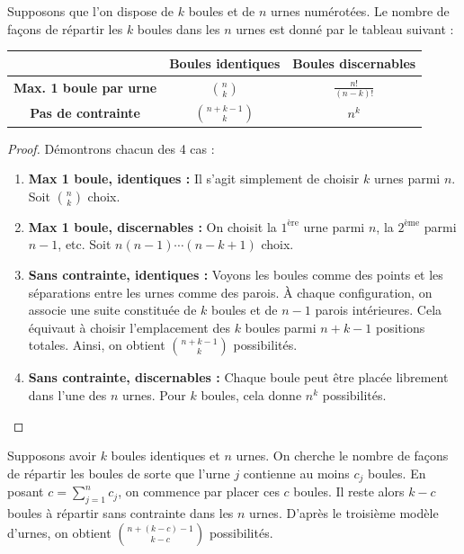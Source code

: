 \begin{proposition}
    Supposons que l'on dispose de $k$ boules et de $n$ urnes numérotées. Le nombre de façons de répartir les $k$ boules dans les $n$ urnes est donné par le tableau suivant :
    \begin{center}
    \renewcommand{\arraystretch}{1.8}
    \begin{tabular}{|c|c|c|}
         \hline
         & \textbf{Boules identiques} & \textbf{Boules discernables} \\
         \hline
         \textbf{Max. 1 boule par urne} & $\displaystyle \binom{n}{k}$ & $\displaystyle \frac{n!}{(n-k)!}$ \\
         \hline
         \textbf{Pas de contrainte} & $\displaystyle \binom{n+k-1}{k}$ & $n^k$ \\
         \hline
    \end{tabular}
    \end{center}
\end{proposition}

\begin{proof}
    Démontrons chacun des 4 cas :
    \begin{enumerate}
        \item \textbf{Max 1 boule, identiques :} Il s'agit simplement de choisir $k$ urnes parmi $n$. Soit $\binom{n}{k}$ choix.
        \item \textbf{Max 1 boule, discernables :} On choisit la $1^{\text{ère}}$ urne parmi $n$, la $2^{\text{ème}}$ parmi $n-1$, etc. Soit $n(n-1)\dotsm(n-k+1)$ choix.
        \item \textbf{Sans contrainte, identiques :} Voyons les boules comme des points et les séparations entre les urnes comme des parois. À chaque configuration, on associe une suite constituée de $k$ boules et de $n-1$ parois intérieures. Cela équivaut à choisir l'emplacement des $k$ boules parmi $n+k-1$ positions totales. Ainsi, on obtient $\binom{n+k-1}{k}$ possibilités.
        \item \textbf{Sans contrainte, discernables :} Chaque boule peut être placée librement dans l'une des $n$ urnes. Pour $k$ boules, cela donne $n^k$ possibilités.
    \end{enumerate}
\end{proof}

\begin{exemple}
    Supposons avoir $k$ boules identiques et $n$ urnes. On cherche le nombre de façons de répartir les boules de sorte que l'urne $j$ contienne au moins $c_j$ boules. En posant $c= \sum_{j=1}^n c_j$, on commence par placer ces $c$ boules. Il reste alors $k-c$ boules à répartir sans contrainte dans les $n$ urnes. D'après le troisième modèle d'urnes, on obtient $\binom{n+(k-c)-1}{k-c}$ possibilités.
\end{exemple}

